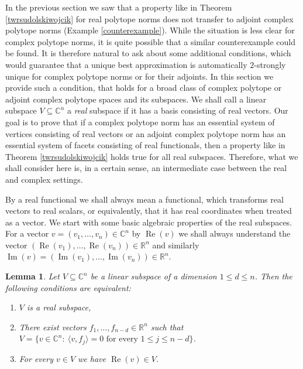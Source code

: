 \documentclass[12pt, reqno]{amsart}
\newtheorem{lem}[twr]{Lemma}
\theoremstyle{definition}
\theoremstyle{remark}
\numberwithin{equation}{section}
\DeclareMathOperator{\re}{Re}
\DeclareMathOperator{\im}{Im}
\begin{document}
In the previous section we saw that a property like in Theorem \ref{twrsudolskiwojcik} for real polytope norms does not transfer to adjoint complex polytope norms (Example \ref{counterexample}). While the situation is less clear for complex polytope norms, it is quite possible that a similar counterexample could be found. It is therefore natural to ask about some additional conditions, which would guarantee that a unique best approximation is automatically $2$-strongly unique for complex polytope norms or for their adjoints. In this section we provide such a condition, that holds for a broad class of complex polytope or adjoint complex polytope spaces and its subspaces. We shall call a linear subspace $V \subseteq \mathbb{C}^n$ a \emph{real} subspace if it has a basis consisting of real vectors. Our goal is to prove that if a complex polytope norm has an essential system of vertices consisting of real vectors or an adjoint complex polytope norm has an essential system of facets consisting of real functionals, then a property like in Theorem \ref{twrsudolskiwojcik} holds true for all real subspaces. Therefore, what we shall consider here is, in a certain sense, an intermediate case between the real and complex settings.

By a real functional we shall always mean a functional, which transforms real vectors to real scalars, or equivalently, that it has real coordinates when treated as a vector. We start with some basic algebraic properties of the real subspaces. For a vector $v=(v_1, \ldots, v_n) \in \mathbb{C}^n$ by $\re(v)$ we shall always understand the vector $(\re(v_1), \ldots, \re(v_n)) \in \mathbb{R}^n$ and similarly $\im(v) = (\im(v_1), \ldots, \im(v_n)) \in \mathbb{R}^n$.

\begin{lem}
\label{realcond}
Let $V \subseteq \mathbb{C}^n$ be a linear subspace of a dimension $1 \leq d \leq n$. Then the following conditions are equivalent:
\begin{enumerate}
\item $V$ is a real subspace,
\item There exist vectors $f_1, \ldots, f_{n-d} \in \mathbb{R}^n$ such that $V = \{ v \in \mathbb{C}^{n}: \ \langle v, f_j \rangle = 0 \text { for every } 1 \leq j \leq n-d\}$.
\item For every $v \in V$ we have $\re(v) \in V$.
\end{enumerate}

\end{lem}
\end{document}
